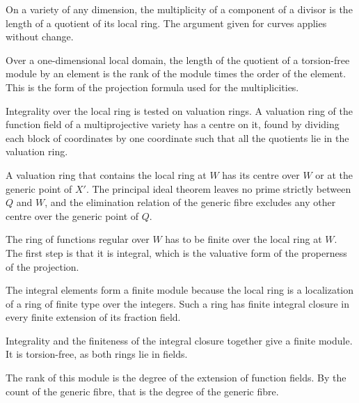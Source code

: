 On a variety of any dimension, the multiplicity of a component of a divisor is the length of a quotient of its local
ring. The argument given for curves applies without change.

Over a one-dimensional local domain, the length of the quotient of a torsion-free module by an element is the rank of
the module times the order of the element. This is the form of the projection formula used for the multiplicities.

Integrality over the local ring is tested on valuation rings. A valuation ring of the function field of a multiprojective
variety has a centre on it, found by dividing each block of coordinates by one coordinate such that all the quotients lie
in the valuation ring.

A valuation ring that contains the local ring at $W$ has its centre over $W$ or at the generic point of $X'$. The
principal ideal theorem leaves no prime strictly between $Q$ and $W$, and the elimination relation of the generic fibre
excludes any other centre over the generic point of $Q$.

The ring of functions regular over $W$ has to be finite over the local ring at $W$. The first step is that it is
integral, which is the valuative form of the properness of the projection.

The integral elements form a finite module because the local ring is a localization of a ring of finite type over the
integers. Such a ring has finite integral closure in every finite extension of its fraction field.

Integrality and the finiteness of the integral closure together give a finite module. It is torsion-free, as both rings
lie in fields.

The rank of this module is the degree of the extension of function fields. By the count of the generic fibre, that is
the degree of the generic fibre.

